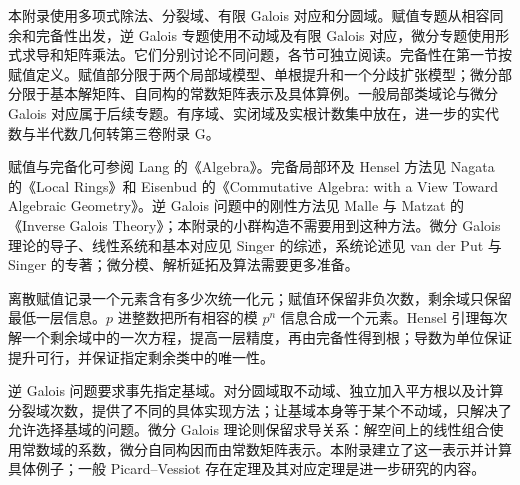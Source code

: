 \ProseParagraphBreak

本附录使用多项式除法、分裂域、有限 Galois 对应和分圆域。赋值专题从相容同余和完备性出发，逆 Galois 专题使用不动域及有限 Galois 对应，微分专题使用形式求导和矩阵乘法。它们分别讨论不同问题，各节可独立阅读。完备性在第一节按赋值定义。赋值部分限于两个局部域模型、单根提升和一个分歧扩张模型；微分部分限于基本解矩阵、自同构的常数矩阵表示及具体算例。一般局部类域论与微分 Galois 对应属于后续专题。有序域、实闭域及实根计数集中放在，进一步的实代数与半代数几何转第三卷附录 G。

\ProseParagraphBreak
赋值与完备化可参阅 Lang 的《Algebra》\cite[Chapter XII, \S\S 1--2, 4--7]{Lang2002}。完备局部环及 Hensel 方法见 Nagata 的《Local Rings》\cite[Chapter II; Chapter VII, 43--44]{Nagata1975LocalRings}和 Eisenbud 的《Commutative Algebra: with a View Toward Algebraic Geometry》\cite[Sections 7.1--7.3, 7.5]{Eisenbud1995CommutativeAlgebra}。逆 Galois 问题中的刚性方法见 Malle 与 Matzat 的《Inverse Galois Theory》\cite[The Rigidity Method, pp. 1--90]{MalleMatzat2018InverseGalois}；本附录的小群构造不需要用到这种方法。微分 Galois 理论的导子、线性系统和基本对应见 Singer 的综述\cite[Sections 1.2--1.3]{Singer2009DifferentialGalois}，系统论述见 van der Put 与 Singer 的专著\cite[Chapter 1, Sections 1.1--1.4]{VanDerPutSinger2003GaloisTheory}；微分模、解析延拓及算法需要更多准备。

%
%





\begin{chaptersummary}
	离散赋值记录一个元素含有多少次统一化元；赋值环保留非负次数，剩余域只保留最低一层信息。\(p\) 进整数把所有相容的模 \(p^n\) 信息合成一个元素。Hensel 引理每次解一个剩余域中的一次方程，提高一层精度，再由完备性得到根；导数为单位保证提升可行，并保证指定剩余类中的唯一性。

	\ProseParagraphBreak
	逆 Galois 问题要求事先指定基域。对分圆域取不动域、独立加入平方根以及计算分裂域次数，提供了不同的具体实现方法；让基域本身等于某个不动域，只解决了允许选择基域的问题。微分 Galois 理论则保留求导关系：解空间上的线性组合使用常数域的系数，微分自同构因而由常数矩阵表示。本附录建立了这一表示并计算具体例子；一般 Picard--Vessiot 存在定理及其对应定理是进一步研究的内容。
\end{chaptersummary}

